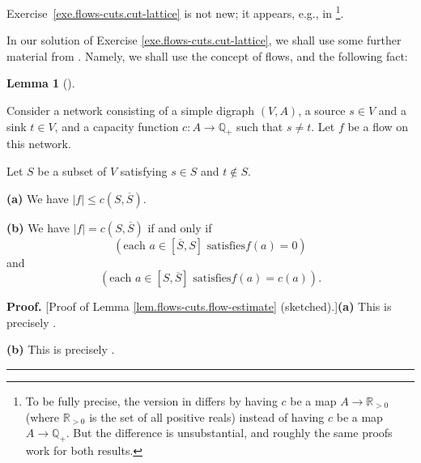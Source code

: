 \documentclass[numbers=enddot,12pt,final,onecolumn,notitlepage]{scrartcl}%
\theoremstyle{definition}
\newtheorem{lem}[theo]{Lemma}
\newenvironment{lemma}[1][]
{\begin{lem}[#1]\begin{leftbar}}
{\end{leftbar}\end{lem}}
\newenvironment{proof}[1][Proof]{\noindent\textbf{#1.} }{\ \rule{0.5em}{0.5em}}
\newcommand{\QQ}{\mathbb{Q}}
\newcommand{\RR}{\mathbb{R}}
\begin{document}
Exercise~\ref{exe.flows-cuts.cut-lattice} is not new;
it appears, e.g., in \cite[Corollary 3]{PicQue80}\footnote{To
  be fully precise, the version in
  \cite[Corollary 3]{PicQue80} differs by having $c$ be
  a map $A \to \RR_{> 0}$ (where $\RR_{> 0}$ is the set of
  all positive reals) instead of having $c$ be a map
  $A \to \QQ_+$. But the difference is unsubstantial,
  and roughly the same proofs work for both results.}.

In our solution of Exercise \ref{exe.flows-cuts.cut-lattice}, we shall use
some further material from
\cite{lec16}. Namely, we shall use the concept of flows, and the following fact:

\begin{lemma}
\label{lem.flows-cuts.flow-estimate}Consider a network consisting of a
simple digraph
$\left(  V,A\right)  $, a source $s\in V$ and a sink $t\in V$, and a capacity
function $c:A\rightarrow\mathbb{Q}_{+}$ such that $s\neq t$. Let $f$ be a flow
on this network.

Let $S$ be a subset of $V$ satisfying $s\in S$ and $t\notin S$.

\textbf{(a)} We have $\left\vert f\right\vert \leq c\left(  S,\overline
{S}\right)  $.

\textbf{(b)} We have $\left\vert f\right\vert =c\left(  S,\overline{S}\right)
$ if and only if
\begin{equation}
\left(  \text{each }a\in\left[  \overline{S},S\right]  \text{ satisfies
}f\left(  a\right)  =0\right)  \label{eq.lem.flows-cuts.flow-estimate.b.1}
\end{equation}
and
\begin{equation}
\left(  \text{each }a\in\left[  S,\overline{S}\right]  \text{ satisfies
}f\left(  a\right)  =c\left(  a\right)  \right)
.\label{eq.lem.flows-cuts.flow-estimate.b.2}%
\end{equation}

\end{lemma}

\begin{proof}
[Proof of Lemma \ref{lem.flows-cuts.flow-estimate} (sketched).]\textbf{(a)}
This is precisely \cite[Proposition 1.7 \textbf{(c)}]{lec16}.

\textbf{(b)} This is precisely \cite[Proposition 1.7 \textbf{(d)}]{lec16}.
\end{proof}
\end{document}
